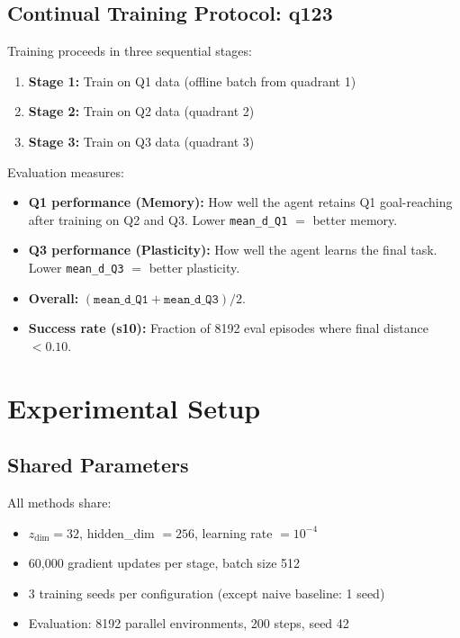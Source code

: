 \documentclass[11pt,a4paper]{article}
\begin{document}
\subsection{Continual Training Protocol: q123}
Training proceeds in three sequential stages:
\begin{enumerate}
    \item \textbf{Stage 1:} Train on Q1 data (offline batch from quadrant 1)
    \item \textbf{Stage 2:} Train on Q2 data (quadrant 2)
    \item \textbf{Stage 3:} Train on Q3 data (quadrant 3)
\end{enumerate}
Evaluation measures:
\begin{itemize}
    \item \textbf{Q1 performance (Memory):} How well the agent retains Q1 goal-reaching after training on Q2 and Q3.
    Lower \texttt{mean\_d\_Q1} $=$ better memory.
    \item \textbf{Q3 performance (Plasticity):} How well the agent learns the final task.
    Lower \texttt{mean\_d\_Q3} $=$ better plasticity.
    \item \textbf{Overall:} $(\texttt{mean\_d\_Q1} + \texttt{mean\_d\_Q3}) / 2$.
    \item \textbf{Success rate (s10):} Fraction of 8192 eval episodes where final distance $< 0.10$.
\end{itemize}

\section{Experimental Setup}

\subsection{Shared Parameters}
All methods share:
\begin{itemize}
    \item $z_{\text{dim}} = 32$, hidden\_dim $= 256$, learning rate $= 10^{-4}$
    \item 60{,}000 gradient updates per stage, batch size 512
    \item 3 training seeds per configuration (except naive baseline: 1 seed)
    \item Evaluation: 8192 parallel environments, 200 steps, seed 42
\end{itemize}
\end{document}
